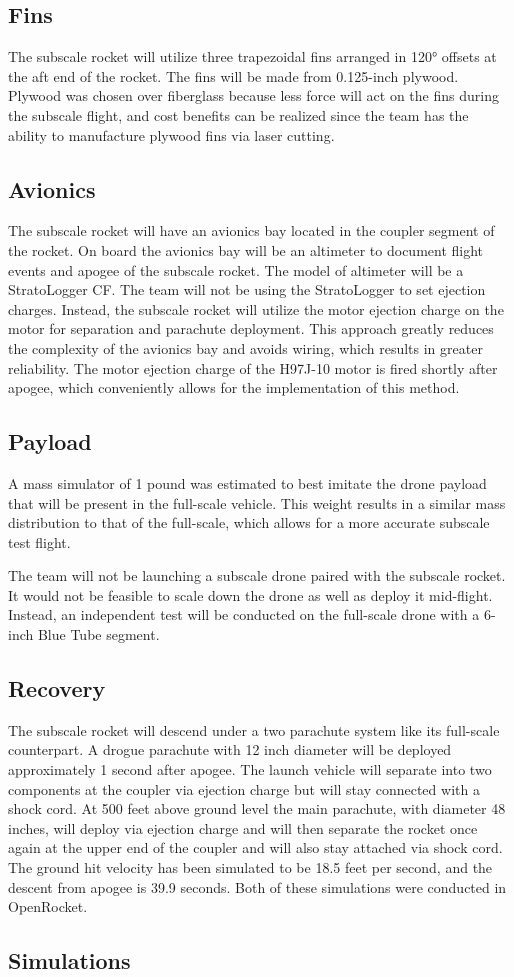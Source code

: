     \subsection{Fins}
The subscale rocket will utilize three trapezoidal fins arranged in 120° offsets at the aft end of the rocket. The fins will be made from 0.125-inch plywood. Plywood was chosen over fiberglass because less force will act on the fins during the subscale flight, and cost benefits can be realized since the team has the ability to manufacture plywood fins via laser cutting.

    \subsection{Avionics}
The subscale rocket will have an avionics bay located in the coupler segment of the rocket. On board the avionics bay will be an altimeter to document flight events and apogee of the subscale rocket. The model of altimeter will be a StratoLogger CF.
The team will not be using the StratoLogger to set ejection charges. Instead, the subscale rocket will utilize the motor ejection charge on the motor for separation and parachute deployment. This approach greatly reduces the complexity of the avionics bay and avoids wiring, which results in greater reliability. The motor ejection charge of the H97J-10 motor is fired shortly after apogee, which conveniently allows for the implementation of this method.

    \subsection{Payload}
 A mass simulator of 1 pound was estimated to best imitate the drone payload that will be present in the full-scale vehicle. This weight results in a similar mass distribution to that of the full-scale, which allows for a more accurate subscale test flight. 

The team will not be launching a subscale drone paired with the subscale rocket. It would not be feasible to scale down the drone as well as deploy it mid-flight. Instead, an independent test will be conducted on the full-scale drone with a 6-inch Blue Tube segment.
   
    \subsection{Recovery}
The subscale rocket will descend under a two parachute system like its full-scale counterpart. A drogue parachute with 12 inch diameter will be deployed approximately 1 second after apogee. The launch vehicle will separate into two components at the coupler via ejection charge but will stay connected with a shock cord. At 500 feet above ground level the main parachute, with diameter 48 inches, will deploy via ejection charge and will then separate the rocket once again at the upper end of the coupler and will also stay attached via shock cord. The ground hit velocity has been simulated to be 18.5 feet per second, and the descent from apogee is 39.9 seconds. Both of these simulations were conducted in OpenRocket. 

    \subsection{Simulations}
    

